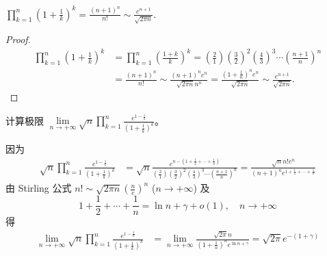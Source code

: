 \documentclass[../../main.tex]{subfiles}%
\begin{document}
\begin{proposition}
$\prod_{k=1}^n{\left( 1+\frac{1}{k} \right) ^k}=\frac{\left( n+1 \right) ^n}{n!}\sim \frac{e^{n+1}}{\sqrt{2\pi n}}.$
\end{proposition}
\begin{proof}

\begin{align*}
\prod_{k=1}^n{\left( 1+\frac{1}{k} \right) ^k}&=\prod_{k=1}^n{\left( \frac{1+k}{k} \right) ^k}=\left( \frac{2}{1} \right) \left( \frac{3}{2} \right) ^2\left( \frac{4}{3} \right) ^3\cdots \left( \frac{n+1}{n} \right) ^n
\\
&=\frac{\left( n+1 \right) ^n}{n!}\sim \frac{\left( n+1 \right) ^ne^n}{\sqrt{2\pi n}n^n}=\frac{\left( 1+\frac{1}{n} \right) ^ne^n}{\sqrt{2\pi n}}\sim \frac{e^{n+1}}{\sqrt{2\pi n}}.
\end{align*}

\end{proof}

\begin{example}
计算极限 $\lim\limits_{n \to +\infty} \sqrt{n} \prod_{k = 1}^{n} \frac{e^{1 - \frac{1}{k}}}{(1 + \frac{1}{k})^k}$。
\end{example}
\begin{solution}

因为
\begin{align*}
\sqrt{n} \prod_{k = 1}^{n} \frac{e^{1 - \frac{1}{k}}}{(1 + \frac{1}{k})^k} &= \sqrt{n} \frac{e^{n - (1 + \frac{1}{2} + \cdots + \frac{1}{n})}}{(\frac{2}{1})(\frac{3}{2})^2 (\frac{4}{3})^3 \cdots (\frac{n + 1}{n})^n} = \frac{\sqrt{n}n!e^n}{(n + 1)^n e^{1 + \frac{1}{2} + \cdots + \frac{1}{n}}}
\end{align*}
由 Stirling 公式 $n! \sim \sqrt{2\pi n} (\frac{n}{e})^n$ ($n \to +\infty$) 及
\[1 + \frac{1}{2} + \cdots + \frac{1}{n} = \ln n + \gamma + o(1),\quad n \to +\infty\]
得
\begin{align*}
\lim_{n \to +\infty} \sqrt{n} \prod_{k = 1}^{n} \frac{e^{1 - \frac{1}{k}}}{(1 + \frac{1}{k})^k} &= \lim_{n \to +\infty} \frac{\sqrt{2\pi}n}{(1 + \frac{1}{n})^n e^{\ln n + \gamma}} = \sqrt{2\pi} e^{-(1 + \gamma)}
\end{align*} 

\end{solution}
\end{document}
